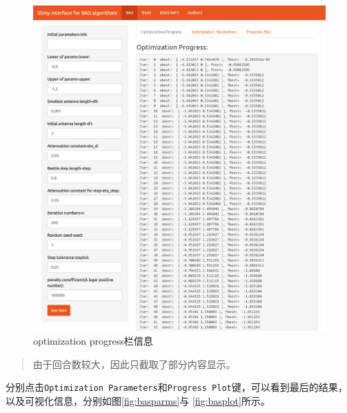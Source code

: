 \documentclass[]{ctexbook}
\theoremstyle{definition}
\theoremstyle{definition}
\theoremstyle{definition}
\theoremstyle{remark}
\begin{document}
\begin{figure}

{\centering \includegraphics[width=0.95\linewidth]{img/app2} 

}

\caption{optimization progress栏信息}\label{fig:basprogress}
\end{figure}

\begin{quote}
由于回合数较大，因此只截取了部分内容显示。
\end{quote}

分别点击\texttt{Optimization\ Parameters}和\texttt{Progress\ Plot}键，可以看到最后的结果，以及可视化信息，分别如图\ref{fig:basparms}与
\ref{fig:basplot}所示。
\end{document}
